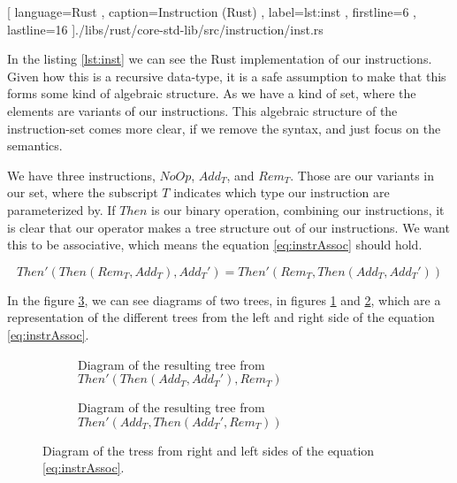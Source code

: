 \begin{code}[H]
  
   [ language=Rust
   , caption={Instruction (Rust)}
   , label=lst:inst
   , firstline=6
   , lastline=16
   ]{./libs/rust/core-std-lib/src/instruction/inst.rs}
\end{code}

In the listing \ref{lst:inst} we can see the Rust implementation of our
instructions. Given how this is a recursive data-type, it is a safe assumption
to make that this forms some kind of algebraic structure. As we have a kind of
set, where the elements are variants of our instructions. This algebraic
structure of the instruction-set comes more clear, if we remove the syntax, and
just focus on the semantics.

We have three instructions, $NoOp$, $Add_T$, and $Rem_T$. Those are our variants
in our set, where the subscript $T$ indicates which type our instruction are
parameterized by. If $Then$ is our binary operation, combining our instructions,
it is clear that our operator makes a tree structure out of our instructions. We
want this to be associative, which means the equation \ref{eq:instrAssoc} should
hold.

\begin{equation} \label{eq:instrAssoc}
  Then'(Then(Rem_T, Add_T), Add_T') = Then'(Rem_T, Then(Add_T, Add_T'))
\end{equation}

In the figure \ref{fig:instrTree}, we can see diagrams of two trees,
in figures \ref{sfig:instrTree1} and \ref{sfig:instrTree2}, which are a
representation of the different trees from the left and right side of the
equation \ref{eq:instrAssoc}.

\begin{figure}[H]
  \begin{subfigure}[h]{0.49\linewidth}
    \centering
    
    \caption{
      Diagram of the resulting tree from $Then'(Then(Add_T, Add_T'), Rem_T)$
    }
    \label{sfig:instrTree1}
  \end{subfigure}
  \hfill
  \begin{subfigure}[h]{0.49\linewidth}
    \centering
    
    \caption{
      Diagram of the resulting tree from $Then'(Add_T, Then(Add_T', Rem_T))$
    }
    \label{sfig:instrTree2}
  \end{subfigure}
  \caption{
    Diagram of the tress from right and left sides of the equation
    \ref{eq:instrAssoc}.
  }
  \label{fig:instrTree}
\end{figure}

